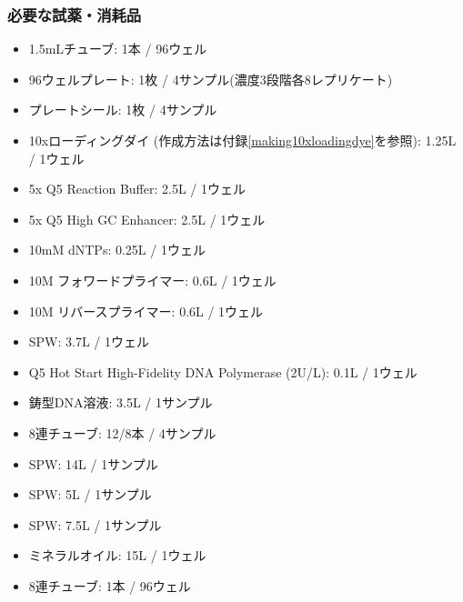 \documentclass[titlepage,10pt,a4paper,uplatex]{jsbook}
\begin{document}
\subsubsection{必要な試薬・消耗品}
\begin{itemize}
\item 1.5mLチューブ: 1本 / 96ウェル
\item 96ウェルプレート: 1枚 / 4サンプル(濃度3段階各8レプリケート)
\item プレートシール: 1枚 / 4サンプル
\item 10xローディングダイ (作成方法は付録\ref{making10xloadingdye}を参照): 1.25{\textmu}L / 1ウェル
\item 5x Q5 Reaction Buffer: 2.5{\textmu}L / 1ウェル
\item 5x Q5 High GC Enhancer: 2.5{\textmu}L / 1ウェル
\item 10mM dNTPs: 0.25{\textmu}L / 1ウェル
\item 10{\textmu}M フォワードプライマー: 0.6{\textmu}L / 1ウェル
\item 10{\textmu}M リバースプライマー: 0.6{\textmu}L / 1ウェル
\item SPW: 3.7{\textmu}L / 1ウェル
\item Q5 Hot Start High-Fidelity DNA Polymerase (2U/{\textmu}L): 0.1{\textmu}L / 1ウェル
\item 鋳型DNA溶液: 3.5{\textmu}L / 1サンプル
\item 8連チューブ: 12/8本 / 4サンプル
\item SPW: 14{\textmu}L / 1サンプル
\item SPW: 5{\textmu}L / 1サンプル
\item SPW: 7.5{\textmu}L / 1サンプル
\item ミネラルオイル: 15{\textmu}L / 1ウェル
\item 8連チューブ: 1本 / 96ウェル
\end{itemize}
\end{document}
